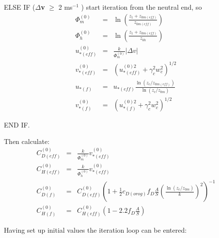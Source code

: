 \documentclass{UMDP_article}
\begin{document}
ELSE IF ($\Delta $\textbf{v} $\ge $ 2 ms$^{-1}$ ) start iteration from
the neutral end, so
\begin{eqnarray}
  \Phi _m^{(0)}&=&\ln  \left( {\frac{ z_1 +  z_{0m(eff)} }{ z_{0m(eff)} }} \right)
  \label{2.2.5} \\
  \Phi _h^{(0)}&=&\ln  \left( {\frac{ z_1 +  z_{0m(eff)} }{ z_{0h} }} \right)
  \label{2.2.6} \\
  u_{\ast (eff)}^{(0)}&=&\frac{k}{ \Phi _m^{(0)} } \left| {\Delta {{{v}}}} \right|
  \label{2.2.7} \\
  v_{\ast (eff)}^{(0)}&=& {\left( { u_{\ast (eff)}^{(0) 2} +  \gamma _c^2  w_c^2 } \right)}^{ 1/2}
  \label{2.2.8} \\
  u_{\ast (f)}&=& u_{\ast (eff)} \frac{\ln (  z_c /  z_{0m(eff)} )}{\ln (  z_c /  z_{0m} )}
  \label{2.2.9} \\
  v_{\ast (f)}^{(0)}&=& {\left( { u_{\ast (f)}^{(0) 2} +  \gamma _c^2  w_c^2 } \right)}^{ 1/2}
  \label{2.2.10}
\end{eqnarray}

END IF.

Then calculate:
\begin{eqnarray}
  C_{D(eff)}^{(0)}&=&\frac{k}{ \Phi _m^{(0)} }  v_{\ast (eff)}^{(0)}
  \label{(2.2.11} \\
  C_{H(eff)}^{(0)}&=&\frac{k}{ \Phi _h^{(0)} }  v_{\ast (eff)}^{(0)}
  \label{(2.2.12} \\
  C_{D(f)}^{(0)}&=& C_{D(eff)}^{(0)}  {\left( {1 + \frac{1}{2} c_{D(orog)}  f_D \frac{A}{S}  {\left( {\frac{\ln ( z_c /  z_{0m} )}{k}} \right)}^2 } \right)}^{-1}
  \label{(2.2.13} \\
  C_{H(f)}^{(0)}&=& C_{H(eff)}^{(0)} \left( {1 - 2.2  f_D \frac{A}{S}} \right)
  \label{(2.2.14}
\end{eqnarray}

Having set up initial values the iteration loop can be entered:
\end{document}
